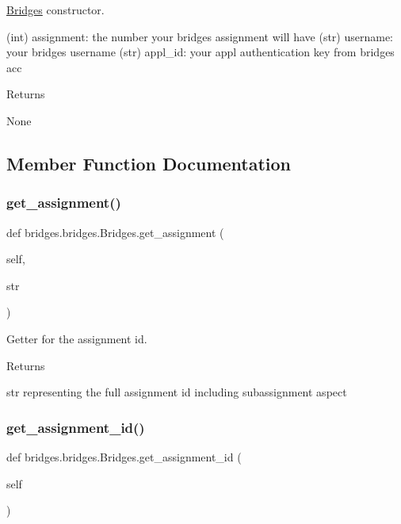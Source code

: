 \hyperlink{classbridges_1_1bridges_1_1_bridges}{Bridges} constructor. 

(int) assignment\+: the number your bridges assignment will have (str) username\+: your bridges username (str) appl\+\_\+id\+: your appl authentication key from bridges acc \begin{DoxyReturn}{Returns}


None 
\end{DoxyReturn}


\subsection{Member Function Documentation}
\mbox{\label{classbridges_1_1bridges_1_1_bridges_a1e7bd56f6a3beb03c91fc989cf3f7eb8}} 
\subsubsection{\texorpdfstring{get\+\_\+assignment()}{get\_assignment()}}
{\footnotesize\ttfamily def bridges.\+bridges.\+Bridges.\+get\+\_\+assignment (\begin{DoxyParamCaption}\item[{}]{self,  }\item[{}]{str }\end{DoxyParamCaption})}



Getter for the assignment id. 

\begin{DoxyReturn}{Returns}


str representing the full assignment id including subassignment aspect 
\end{DoxyReturn}
\mbox{\label{classbridges_1_1bridges_1_1_bridges_a94f39f11368031ad33800aac0bac2f7d}} 
\subsubsection{\texorpdfstring{get\+\_\+assignment\+\_\+id()}{get\_assignment\_id()}}
{\footnotesize\ttfamily def bridges.\+bridges.\+Bridges.\+get\+\_\+assignment\+\_\+id (\begin{DoxyParamCaption}\item[{}]{self }\end{DoxyParamCaption})}



